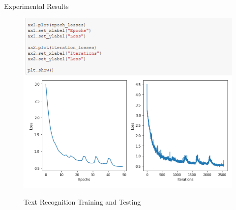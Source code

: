 \documentclass{beamer}
\begin{document}
\begin{frame}[allowframebreaks]{Experimental Results}
	\begin{figure}
				{\includegraphics[scale=.3]{Recognition_Result}}
				\caption{Text Recognition Training and Testing}
				\label{Recognition_Result}
	\end{figure}


\end{frame}
\end{document}
